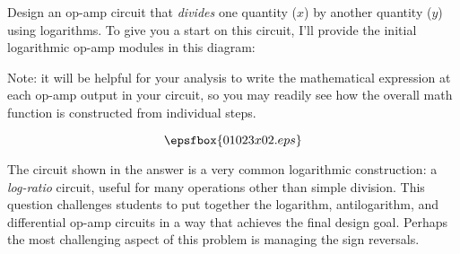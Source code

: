 

Design an op-amp circuit that {\it divides} one quantity ($x$) by another quantity ($y$) using logarithms.  To give you a start on this circuit, I'll provide the initial logarithmic op-amp modules in this diagram:

\vskip 10pt


\vskip 10pt

Note: it will be helpful for your analysis to write the mathematical expression at each op-amp output in your circuit, so you may readily see how the overall math function is constructed from individual steps.







$$\epsfbox{01023x02.eps}$$







The circuit shown in the answer is a very common logarithmic construction: a {\it log-ratio} circuit, useful for many operations other than simple division.  This question challenges students to put together the logarithm, antilogarithm, and differential op-amp circuits in a way that achieves the final design goal.  Perhaps the most challenging aspect of this problem is managing the sign reversals.





